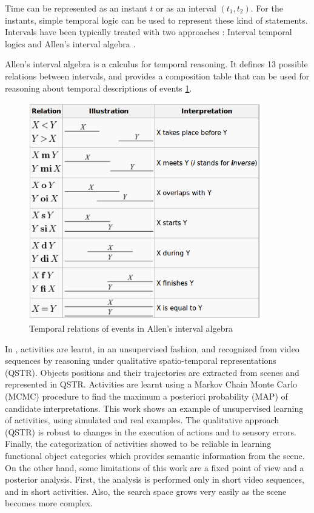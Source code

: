Time can be represented as an instant $t$ or as an interval $(t_1,t_2)$. 
For the instants, simple temporal logic can be used to represent these kind of statements. 
Intervals have been typically treated with two approaches \citep{Fisher2008_TempRepReas}: Interval temporal logics \citep{Moszkowski1983_RDC} and Allen's interval algebra \citep{Allen83_MaintainingKnowledgeTemporal}.


Allen's interval algebra is a calculus for temporal reasoning.
It defines 13 possible relations between intervals, and provides a composition table that can be used for reasoning about temporal descriptions of events \ref{fig:allen}.

\begin{figure}[h]
\centering
\includegraphics[width=4in]{fig/allen_interval.png}
\caption{Temporal relations of events in Allen's interval algebra}
\label{fig:allen}
\end{figure}


In \citep{Sridhar10_PhD_UnsupervisedLearningEvent}, activities are learnt, in an unsupervised fashion, and recognized from video sequences by reasoning under qualitative spatio-temporal representations (QSTR). 
Objects positions and their trajectories are extracted from scenes and represented in QSTR.
Activities are learnt using a Markov Chain Monte Carlo (MCMC) procedure to find the maximum a posteriori probability (MAP) of candidate interpretations.
This work shows an example of unsupervised learning of activities, using simulated and real examples.
The qualitative approach (QSTR) is robust to changes in the execution of actions and to sensory errors.
Finally, the categorization of activities showed to be reliable in learning functional object categories which provides semantic information from the scene.
On the other hand, some limitations of this work are a fixed point of view and a posterior analysis.
First, the analysis is performed only in short video sequences, and in short activities.
Also, the search space grows very easily as the scene becomes more complex.

